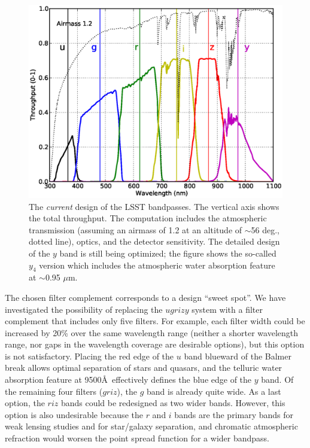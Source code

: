 \documentclass{emulateapj}
\begin{document}
\begin{figure}
\hskip -0.13in
\includegraphics[width=1.1\hsize,clip]{filters_y4.ps}
\caption{The {\it current} design of the LSST bandpasses. 
The vertical axis shows the total throughput. The computation includes the atmospheric 
transmission (assuming an airmass of 1.2 at an altitude of $\sim$56 deg., dotted line), optics, and the 
detector sensitivity. The detailed design of the $y$ band is still being optimized; the figure 
shows the so-called $y_4$ version which includes the atmospheric water absorption feature 
at $\sim$0.95 $\mu$m.} 
\label{Fig:filters}
\end{figure}


The chosen filter complement corresponds to a design ``sweet spot''. We have 
investigated the possibility of replacing the $ugrizy$ system with a
filter complement that includes only five filters. For example, each filter
width could be increased by 20\% over the same wavelength range (neither a
shorter wavelength range, nor gaps in the wavelength coverage are desirable 
options), but this option is not satisfactory. Placing the red edge of the $u$ 
band blueward of the Balmer break allows optimal separation of stars and
quasars, and the telluric water absorption feature at 9500\AA\
effectively defines the blue edge of the $y$ band. Of the remaining four
filters ($griz$), the $g$ band is already quite wide. As a last option, the 
$riz$ bands could be redesigned as two wider bands. However, this option is also 
undesirable because the $r$ and $i$ bands are the primary bands for weak
lensing studies and for star/galaxy separation, and chromatic atmospheric
refraction would worsen the point spread function for a wider bandpass. 
\end{document}
